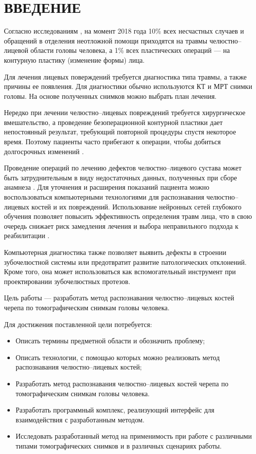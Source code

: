 \section*{ВВЕДЕНИЕ}

Согласно исследованиям \cite{facialfracs0}\cite{isaps}, на момент 2018 года 10\% всех несчастных случаев и обращений в отделения неотложной помощи приходятся на травмы челюстно--лицевой области головы человека, а 1\% всех пластических операций --- на контурную пластику (изменение формы) лица.

Для лечения лицевых поверждений требуется диагностика типа травмы, а также причины ее появления. Для диагностики обычно используются КТ и МРТ снимки головы. На основе полученных снимков можно выбрать план лечения.

Нередко при лечении челюстно--лицевых повреждений требуется хирургическое вмешательство, а проведение безоперационной контурной пластики дает непостоянный результат, требующий повторной процедуры спустя некоторое время. Поэтому пациенты часто прибегают к операции, чтобы добиться долгосрочных изменений \cite{isaps}.

Проведение операций по лечению дефектов челюстно--лицевого сустава может быть затруднительным в виду недостаточных данных, полученных при сборе анамнеза \cite{facialfracs1}. Для уточнения и расширения показаний пациента можно воспользоваться компьютерными технологиями для распознавания челюстно--лицевых костей и их повреждений. Использование нейронных сетей глубокого обучения позволяет повысить эффективность определения травм лица, что в свою очередь снижает риск замедления лечения и выбора неправильного подхода к реабилитации \cite{facialfracs2}.

Компьютерная диагностика также позволяет выявить дефекты в строении зубочелюстной системы или предотвратит развитие патологических отклонений. Кроме того, она может использоваться как вспомогательный инструмент при проектировании зубочелюстных протезов.

Цель работы --- разработать метод распознавания челюстно--лицевых костей черепа по томографическим снимкам головы человека.

Для достижения поставленной цели потребуется:
\begin{itemize}
\item Описать термины предметной области и обозначить проблему;
\item Описать технологии, с помощью которых можно реализовать метод распознавания челюстно--лицевых костей;
\item Разработать метод распознавания челюстно--лицевых костей черепа по томографическим снимкам головы человека.
\item Разработать программный комплекс, реализующий интерфейс для взаимодействия с разработанным методом.
\item Исследовать разработанный метод на применимость при работе с различными типами томографических снимков и в различных сценариях работы.
\end{itemize}